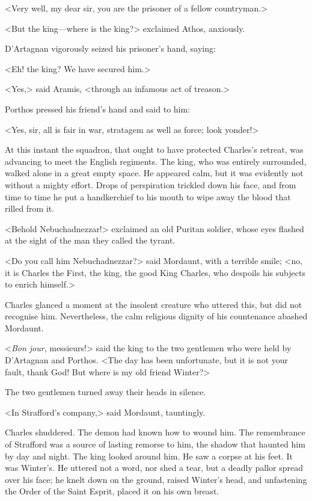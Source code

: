 <Very well, my dear sir, you are the prisoner of a fellow countryman.>

<But the king—where is the king?> exclaimed Athos, anxiously.

D'Artagnan vigorously seized his prisoner's hand, saying:

<Eh! the king? We have secured him.>

<Yes,> said Aramis, <through an infamous act of treason.>

Porthos pressed his friend's hand and said to him:

<Yes, sir, all is fair in war, stratagem as well as force; look yonder!>

At this instant the squadron, that ought to have protected Charles's retreat, was advancing to meet the English regiments. The king, who was entirely surrounded, walked alone in a great empty space. He appeared calm, but it was evidently not without a mighty effort. Drops of perspiration trickled down his face, and from time to time he put a handkerchief to his mouth to wipe away the blood that rilled from it.

<Behold Nebuchadnezzar!> exclaimed an old Puritan soldier, whose eyes flashed at the sight of the man they called the tyrant.

<Do you call him Nebuchadnezzar?> said Mordaunt, with a terrible smile; <no, it is Charles the First, the king, the good King Charles, who despoils his subjects to enrich himself.>

Charles glanced a moment at the insolent creature who uttered this, but did not recognise him. Nevertheless, the calm religious dignity of his countenance abashed Mordaunt.

<\textit{Bon jour}, messieurs!> said the king to the two gentlemen who were held by D'Artagnan and Porthos. <The day has been unfortunate, but it is not your fault, thank God! But where is my old friend Winter?>

The two gentlemen turned away their heads in silence.

<In Strafford's company,> said Mordaunt, tauntingly.

Charles shuddered. The demon had known how to wound him. The remembrance of Strafford was a source of lasting remorse to him, the shadow that haunted him by day and night. The king looked around him. He saw a corpse at his feet. It was Winter's. He uttered not a word, nor shed a tear, but a deadly pallor spread over his face; he knelt down on the ground, raised Winter's head, and unfastening the Order of the Saint Esprit, placed it on his own breast.

